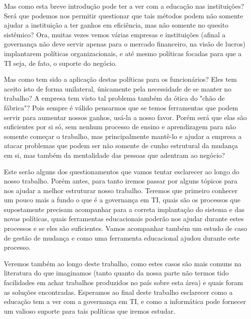 Mas como esta breve introdução pode ter a ver com a educação nas instituições? Será que podemos nos permitir questionar que tais métodos podem não somente ajudar a instituição a ter ganhos em eficiência, mas não somente no quesito sistêmico? Ora, muitas vezes vemos várias empresas e instituições (afinal a governança não deve servir apenas para o mercado financeiro, na visão de lucros) implantarem políticas organizacionais, e até mesmo políticas focadas para que a TI seja, de fato, o suporte do negócio. 

Mas como tem sido a aplicação destas políticas para os funcionários? Eles tem aceito isto de forma unilateral, únicamente pela necessidade de se manter no trabalho? A empresa tem visto tal problema também da ótica do "chão de fábrica"? Pois sempre é válido pensarmos que se temos ferramentas que podem servir para aumentar nossos ganhos, usá-la a nosso favor. Porém será que elas são suficientes por si só, sem nenhum processo de ensino e aprendizagem para não somente começar o trabalho, mas principalmente mantê-lo e ajudar a empresa a atacar problemas que podem ser não somente de cunho estrutural da mudança em si, mas também da mentalidade das pessoas que adentram ao negócio?

Este serão alguns dos questionamentos que vamos tentar esclarecer ao longo do nosso trabalho. Porém antes, para tanto iremos passar por alguns tópicos para nos ajudar a melhor estruturar nosso trabalho. Teremos que primeiro conhecer um pouco mais a fundo o que é a governança em TI, quais são os processos que supostamente precisam acompanhar para a correta implantação do sistema e das novas políticas, quais ferramentas educacionais poderão nos ajudar durante estes processos e se eles são suficientes. Vamos acompanhar também um estudo de caso de gestão de mudança e como uma ferramenta educacional ajudou durante este processo. 

Veremos também ao longo deste trabalho, como estes casos são mais comuns na literatura do que imaginamos (tanto quanto da nossa parte não termos tido facilidades em achar trabalhos produzidos no país sobre esta área) e quais foram as soluções encontradas. Esperamos ao final deste trabalho esclarecer como a educação tem a ver com a governança em TI, e como a informática pode fornecer um valioso suporte para tais políticas que iremos estudar.